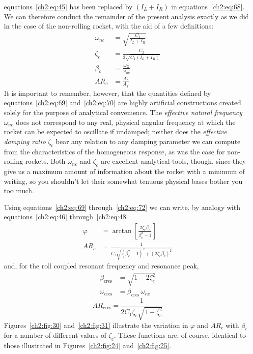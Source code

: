 equations~\eqref{ch2:eq:45} has been replaced by $(I_L + I_R)$ in
equations~\eqref{ch2:eq:68}. We can therefore conduct the remainder of the
present analysis exactly as we did in the case of the non-rolling rocket,
with the aid of a few definitions:
\begin{align}
\omega_{nc} &= \sqrt{\frac{C_1}{I_L + I_R}}\label{ch2:eq:69}\\
\zeta_c &= \frac{C_2}{2\sqrt{C_1(I_L + I_R)}}\label{ch2:eq:70}\\
\beta_c &= \frac{\omega_Z}{\omega_{nc}}\label{ch2:eq:71}\\
\mathit{AR}_c &= \frac{A_r}{A_f}\label{ch2:eq:72}
\end{align}
It is important to remember, however, that the quantities defined by
equations~\eqref{ch2:eq:69} and~\eqref{ch2:eq:70} are highly artificial
constructions created solely for the purpose of analytical convenience. The
\emph{effective natural frequency} $\omega_{nc}$ does not correspond to any
real, physical angular frequency at which the rocket can be expected to
oscillate if undamped; neither does the \emph{effective damping ratio}
$\zeta_c$ bear any relation to any damping parameter we can compute from the
characteristics of the homogeneous response, as was the case for non-rolling
rockets. Both $\omega_{nc}$ and $\zeta_c$ are excellent analytical tools,
though, since they give us a maximum amount of information about the rocket
with a minimum of writing, so you shouldn't let their somewhat tenuous
physical bases bother you too much.

Using equations~\eqref{ch2:eq:69} through~\eqref{ch2:eq:72} we can write, by
analogy with equations~\eqref{ch2:eq:46} through~\eqref{ch2:eq:48}
\begin{subequations}\label{ch2:eq:73}
\begin{align}
\varphi &= \arctan\left[\frac{2\zeta_c\beta_c}{\beta_c^{2} - 1}\right]\label{ch2:eq:73a}\\
\mathit{AR}_c &= \frac{1}{C_1\sqrt{(\beta_c^{2} - 1)^{2} + (2\zeta_c\beta_c)^{2}}}\label{ch2:eq:73b}
\end{align}
\end{subequations}
and, for the roll coupled resonant frequency and resonance peak,
\begin{subequations}\label{ch2:eq:74}
\begin{align}
\beta_{\mathrm{cres}} &= \sqrt{1 - 2\zeta_c^{2}}\label{ch2:eq:74a}\\
\omega_{\mathrm{cres}} &= \beta_{\mathrm{cres}}\,\omega_{nc}\label{ch2:eq:74b}
\end{align}
\end{subequations}
\begin{equation}\label{ch2:eq:75}
\mathit{AR}_{\mathrm{cres}} = \frac{1}{2C_1\zeta_c\sqrt{1 - \zeta_c^{2}}}
\end{equation}
Figures~\ref{ch2:fig:30} and~\ref{ch2:fig:31} illustrate the variation in
$\varphi$ and $\mathit{AR}_c$ with $\beta_c$ for a number of different values of
$\zeta_c$. These functions are, of course, identical to those illustrated in
Figures~\ref{ch2:fig:24} and~\ref{ch2:fig:25}.

